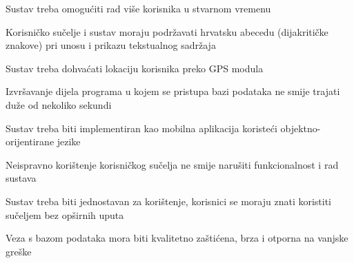 			\begin{packed_item}
				\item Sustav treba omogućiti rad više korisnika u stvarnom vremenu
				\item Korisničko sučelje i sustav moraju podržavati hrvatsku abecedu (dijakritičke znakove) pri unosu i prikazu tekstualnog sadržaja
				\item Sustav treba dohvaćati lokaciju korisnika preko GPS modula
				\item Izvršavanje dijela programa u kojem se pristupa bazi podataka ne smije trajati duže od nekoliko sekundi 
				\item Sustav treba biti implementiran kao mobilna aplikacija koristeći objektno-orijentirane jezike

				\item Neispravno korištenje korisničkog sučelja ne smije narušiti funkcionalnost i rad sustava

				\item Sustav treba biti jednostavan za korištenje, korisnici se moraju znati koristiti sučeljem bez opširnih uputa 
				\item Veza s bazom podataka mora biti kvalitetno zaštićena, brza i otporna na vanjske greške
			\end{packed_item}
			 
			 
			 
	